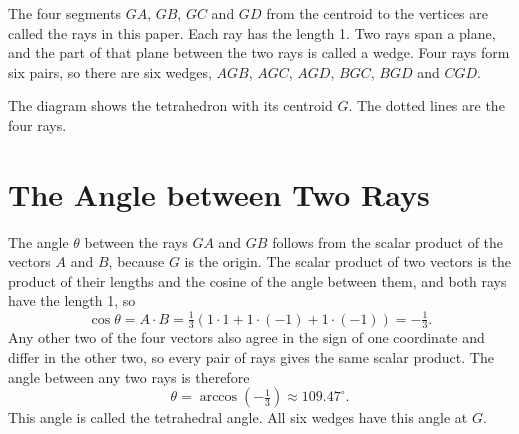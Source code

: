 \documentclass[a4paper,12pt]{article}
\begin{document}
The four segments \( GA \), \( GB \), \( GC \) and \( GD \) from the centroid to the vertices are called the rays in this paper. Each ray has the length 1. Two rays span a plane, and the part of that plane between the two rays is called a wedge. Four rays form six pairs, so there are six wedges, \( AGB \), \( AGC \), \( AGD \), \( BGC \), \( BGD \) and \( CGD \).

\begin{center}
\end{center}

\noindent
The diagram shows the tetrahedron with its centroid \( G \). The dotted lines are the four rays.


\section{The Angle between Two Rays}
\label{sec:angle}
The angle \( \theta \) between the rays \( GA \) and \( GB \) follows from the scalar product of the vectors \( A \) and \( B \), because \( G \) is the origin. The scalar product of two vectors is the product of their lengths and the cosine of the angle between them, and both rays have the length 1, so
\[
\cos\theta = A \cdot B = \tfrac{1}{3}\left( 1 \cdot 1 + 1 \cdot (-1) + 1 \cdot (-1) \right) = -\tfrac{1}{3} .
\]
Any other two of the four vectors also agree in the sign of one coordinate and differ in the other two, so every pair of rays gives the same scalar product. The angle between any two rays is therefore
\[
\theta = \arccos\left(-\tfrac{1}{3}\right) \approx 109.47^\circ .
\]
This angle is called the tetrahedral angle. All six wedges have this angle at \( G \).
\end{document}
